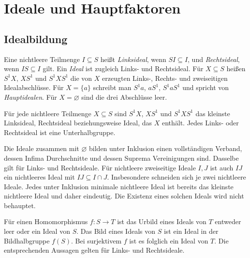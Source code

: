 \chapter{Ideale und Hauptfaktoren}

\section{Idealbildung}

\begin{definition}
Eine nichtleere Teilmenge $I\subseteq S$ heißt \emph{Linksideal},
wenn $SI\subseteq I$, und \emph{Rechtsideal}, wenn $IS\subseteq I$ gilt.
Ein \emph{Ideal} ist zugleich Links- und Rechtsideal.
Für $X\subseteq S$ heißen $S^1X$, $XS^1$ und $S^1XS^1$
die von $X$ erzeugten Links-, Rechts- und zweiseitigen Idealabschlüsse.
Für $X=\{a\}$ schreibt man $S^1a$, $aS^1$, $S^1aS^1$ und spricht
von \emph{Hauptidealen}. Für $X=\varnothing$ sind die drei Abschlüsse leer.
\end{definition}

\begin{theorem}
Für jede nichtleere Teilmenge $X\subseteq S$ sind
$S^1X$, $XS^1$ und $S^1XS^1$ das kleinste Linksideal,
Rechtsideal beziehungsweise Ideal, das $X$ enthält.
Jedes Links- oder Rechtsideal ist eine Unterhalbgruppe.
\cite{harju,howie}
\end{theorem}

\begin{theorem}
Die Ideale zusammen mit $\varnothing$ bilden unter Inklusion
einen vollständigen Verband, dessen Infima Durchschnitte und dessen
Suprema Vereinigungen sind. Dasselbe gilt für Links- und Rechtsideale.
Für nichtleere zweiseitige Ideale $I,J$ ist auch $IJ$ ein nichtleeres
Ideal mit $IJ\subseteq I\cap J$.
Insbesondere schneiden sich je zwei nichtleere Ideale.
Jedes unter Inklusion minimale nichtleere Ideal ist bereits
das kleinste nichtleere Ideal und daher eindeutig.
Die Existenz eines solchen Ideals wird nicht behauptet.
\cite{harju,howie}
\end{theorem}

\begin{theorem}
Für einen Homomorphismus $f:S\to T$ ist das Urbild eines Ideals von
$T$ entweder leer oder ein Ideal von $S$.
Das Bild eines Ideals von $S$ ist ein Ideal in der Bildhalbgruppe $f(S)$.
Bei surjektivem $f$ ist es folglich ein Ideal von $T$.
Die entsprechenden Aussagen gelten für Links- und Rechtsideale.
\cite{harju}
\end{theorem}

